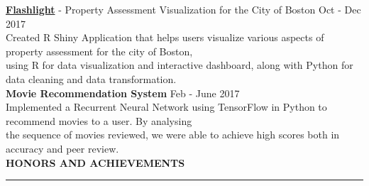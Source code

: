 \documentclass[a4paper]{article}
\newcommand{\myline}{\par
  \kern2pt %
  \hrule height 0.5pt
  \kern2pt %
}
\newcommand{\mybullet}{
	\indent \textbullet \hspace*{2mm}
}
\begin{document}
			\noindent
      \textbf{\href{https://github.com/sichenghao1992/DS5110Project}{Flashlight}} - Property 
			Assessment Visualization for the City of Boston \hfill Oct - Dec 2017 \\
			\mybullet Created R Shiny Application that helps users visualize various aspects of 
			property assessment for the city of  Boston, \\ \hspace*{9mm} using 
			R for data visualization and interactive dashboard, along with Python for data cleaning 
			and data transformation. \\
			
			\noindent
			\textbf{Movie Recommendation System} \hfill Feb - June 2017\\
			\mybullet Implemented a Recurrent Neural Network using TensorFlow in Python to recommend 
      movies to a user. By analysing \\ \hspace*{9mm} the sequence of movies reviewed, we were 
      able to achieve high scores both in accuracy and peer review. \\ 

	
		
	
	\noindent
	{\large \textbf{HONORS AND ACHIEVEMENTS}}
	\myline 
	\smallskip
\end{document}
